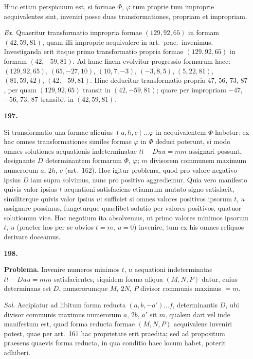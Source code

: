 \documentclass[12pt,a4paper]{article}
\theoremstyle{plain}
\begin{document}
Hinc etiam perspicuum est, si formae $\Phi$, $\varphi$ tum proprie tum improprie aequivalentes sint, inveniri posse duas transformationes, propriam et impropriam.

\textit{Ex.} Quaeritur transformatio impropria formae $(129, 92, 65)$ in formam $(42, 59, 81)$, quam illi improprie aequivalere in art.~prae.~invenimus. Investiganda erit itaque primo transformatio propria formae $(129, 92, 65)$ in formam $(42, -59, 81)$. Ad hunc finem evolvitur progressio formarum haec: $(129, 92, 65)$, $(65, -27, 10)$, $(10, 7, -3)$, $(-3, 8, 5)$, $(5, 22, 81)$, $(81, 59, 42)$, $(42, -59, 81)$. Hinc deducitur transformatio propria $47$, $56$, $73$, $87$, per quam $(129, 92, 65)$ transit in $(42, -59, 81)$; quare per impropriam $-47$, $-56$, $73$, $87$ transibit in $(42, 59, 81)$.

\bigskip

\textbf{197.}

Si transformatio una formae alicuius $(a, h, c)\ldots \varphi$ in aequivalentem $\Phi$ habetur: ex hac omnes transformationes similes formae $\varphi$ in $\Phi$ deduci poterunt, si modo omnes solutiones aequationis indeterminatae $tt - Duu = mm$ assignari possunt, designante $D$ determinantem formarum $\Phi$, $\varphi$; $m$ divisorem communem maximum numerorum $a$, $2h$, $c$ (art.~162). Hoc igitur problema, quod pro valore negativo ipsius $D$ iam supra solvimus, nunc pro positivo aggrediemur. Quia vero manifesto quivis valor ipsius $t$ aequationi satisfaciens etiamnum mutato signo satisfacit, similiterque quivis valor ipsius $u$: sufficiet si omnes valores positivos ipsorum $t$, $u$ assignare possimus, fungeturque quaelibet solutio per valores positivos, quatuor solutionum vice. Hoc negotium ita absolvemus, ut primo valores minimos ipsorum $t$, $u$ (praeter hos per se obvios $t = m$, $u = 0$) invenire, tum ex his omnes reliquos derivare doceamus.

\bigskip

\textbf{198.}

\textbf{Problema.} Invenire numeros minimos $t$, $u$ aequationi indeterminatae $tt - Duu = mm$ satisfacientes, siquidem forma aliqua $(M, N, P)$ datur, cuius determinans est $D$, numerorumque $M$, $2N$, $P$ divisor communis maximus $= m$.

\textit{Sol.} Accipiatur ad libitum forma reducta $(a, b, -a')\ldots f$, determinantis $D$, ubi divisor communis maximus numerorum $a$, $2b$, $a'$ sit $m$, qualem dari vel inde manifestum est, quod forma reducta formae $(M, N, P)$ aequivalens inveniri potest, quae per art.~161 hac proprietate erit praedita; sed ad propositum praesens quaevis forma reducta, in qua conditio haec locum habet, poterit adhiberi.
\end{document}
